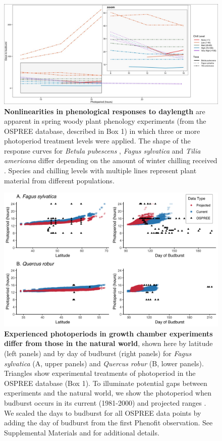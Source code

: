 \documentclass{article}
\begin{document}
 
\begin{figure}[p]
\includegraphics{..//..//analyses/photoperiod/figures/Photo_curv_FINAL.jpeg} 
\caption{\textbf{Nonlinearities in phenological responses to daylength} are apparent in spring woody plant phenology experiments (from the OSPREE database, described in Box 1) in which three or more photoperiod treatment levels were applied. The shape of the response curves for \textit{Betula pubescens} \citep{Caffarra:2011b}, \textit{Fagus sylvatica} \citep{Heide:1993a} and \textit{Tilia americana} \citep{Ashby:1962aa} differ depending on the amount of winter chilling received \citep[measured in Chill portions][]{fishman1987}. Species and chilling levels with multiple lines represent plant material from different populations.}


 \label{fig:photocurve}
 \end{figure}

\begin{figure}[p]
\includegraphics{..//..//analyses/photoperiod/figures/2D_actual_combined.png} 
\caption{\textbf{Experienced photoperiods in growth chamber experiments differ from those in the natural world}, shown here by latitude (left panels) and by day of budburst (right panels) for \emph{Fagus sylvatica} (A, upper panels) and \emph{Quercus robur} (B, lower panels). Triangles show experimental treatments of photoperiod in the OSPREE database (Box 1). To illuminate potential gaps between experiments and the natural world, we show the photoperiod when budburst occurs in its current (1981-2000) and projected ranges \citep[2081-2100, using the A1Fi Phenofit scenario, see][]{duputie2015}. We scaled the days to budburst for all OSPREE data points by adding the day of budburst from the first Phenofit observation. See Supplemental Materials and \citet{duputie2015} for additional details.} 
 \label{fig:fagus}
 \end{figure}
 
\end{document}
